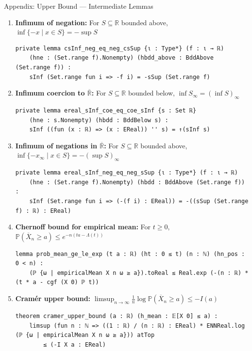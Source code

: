 \documentclass[aspectratio=169]{beamer}
\renewcommand{\P}{\mathbb{P}}
\newcommand{\R}{\mathbb{R}}
\begin{document}
\begin{frame}[fragile]{Appendix: Upper Bound --- Intermediate Lemmas}
  \begin{enumerate}
    \item \textbf{Infimum of negation:} For $S \subseteq \R$ bounded above, $\inf\{-x \mid x \in S\} = -\sup S$
\begin{lstlisting}[basicstyle=\ttfamily\tiny]
private lemma csInf_neg_eq_neg_csSup {ι : Type*} (f : ι → ℝ)
    (hne : (Set.range f).Nonempty) (hbdd_above : BddAbove (Set.range f)) :
    sInf (Set.range fun i => -f i) = -sSup (Set.range f)
\end{lstlisting}
    \item \textbf{Infimum coercion to $\overline{\R}$:} For $S \subseteq \R$ bounded below, $\inf S_\infty = (\inf S)_\infty$
\begin{lstlisting}[basicstyle=\ttfamily\tiny]
private lemma ereal_sInf_coe_eq_coe_sInf {s : Set ℝ}
    (hne : s.Nonempty) (hbdd : BddBelow s) :
    sInf ((fun (x : ℝ) => (x : EReal)) '' s) = ↑(sInf s)
\end{lstlisting}
    \item \textbf{Infimum of negations in $\overline{\R}$:} For $S \subseteq \R$ bounded above, $\inf\{-x_\infty \mid x \in S\} = -(\sup S)_\infty$
\begin{lstlisting}[basicstyle=\ttfamily\tiny]
private lemma ereal_sInf_neg_eq_neg_sSup {ι : Type*} (f : ι → ℝ)
    (hne : (Set.range f).Nonempty) (hbdd : BddAbove (Set.range f)) :
    sInf (Set.range fun i => (-(f i) : EReal)) = -((sSup (Set.range f) : ℝ) : EReal)
\end{lstlisting}
    \item \textbf{Chernoff bound for empirical mean:} For $t \ge 0$, $\P(\overline{X}_n \ge a) \le e^{-n(ta - \Lambda(t))}$
\begin{lstlisting}[basicstyle=\ttfamily\tiny]
lemma prob_mean_ge_le_exp (t a : ℝ) (ht : 0 ≤ t) (n : ℕ) (hn_pos : 0 < n) :
    (ℙ {ω | empiricalMean X n ω ≥ a}).toReal ≤ Real.exp (-(n : ℝ) * (t * a - cgf (X 0) ℙ t))
\end{lstlisting}
    \item \textbf{Cram\'er upper bound:} $\limsup_{n\to\infty} \frac{1}{n}\log\P(\overline{X}_n \ge a) \le -I(a)$
\begin{lstlisting}[basicstyle=\ttfamily\tiny]
theorem cramer_upper_bound (a : ℝ) (h_mean : 𝔼[X 0] ≤ a) :
    limsup (fun n : ℕ => ((1 : ℝ) / (n : ℝ) : EReal) * ENNReal.log (ℙ {ω | empiricalMean X n ω ≥ a})) atTop
        ≤ (-I X a : EReal)
\end{lstlisting}
  \end{enumerate}
\end{frame}
\end{document}
